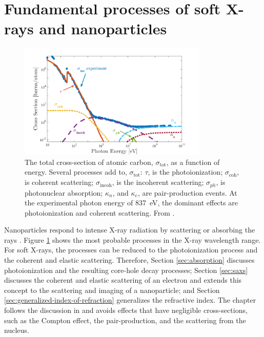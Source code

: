 \section{Fundamental processes of soft X-rays and nanoparticles}\label{sec:light-matter-interaction}
\begin{figure}
	\centering
		\includegraphics[width=0.80\textwidth]{images/absorption-cross-section-carbon-ken.jpg}
	\caption[Total cross-section of atomic carbon.]{The total cross-section of atomic carbon, $\sigma_{\text{tot}}$, as a function of energy. Several processes add to, $\sigma_{\text{tot}}$: $\tau$, is the photoionization; $\sigma_{\text{coh}}$, is coherent scattering; $\sigma_{\text{incoh}}$, is the incoherent scattering; $\sigma_{ph}$, is photonuclear absorption; $\kappa_{n}$, and $\kappa_{e}$, are pair-production events. At the experimental photon energy of \SI{837}{\electronvolt}, the dominant effects are photoionization and coherent scattering. From \citep{Ferguson-2016-PhD,Williams-2009-xb}.}
	\label{fig:absorption-cross-section-carbon-ken}
\end{figure}
%
Nanoparticles respond to intense X-ray radiation by scattering or absorbing the rays \cite{Als-Nielson-2011-JWS}. Figure \ref{fig:absorption-cross-section-carbon-ken} shows the most probable processes in the X-ray wavelength range. For soft X-rays, the processes can be reduced to the photoionization process and the coherent and elastic scattering. Therefore, Section \ref{sec:absorption} discusses photoionization and the resulting core-hole decay processes; Section \ref{sec:saxs} discusses the coherent and elastic scattering of an electron and extends this concept to the scattering and imaging of a nanoparticle; and Section \ref{sec:generalized-index-of-refraction} generalizes the refractive index. The chapter follows the discussion in \citep{Als-Nielson-2011-JWS} and avoids effects that have negligible cross-sections, such as the Compton effect, the pair-production, and the scattering from the nucleus.
